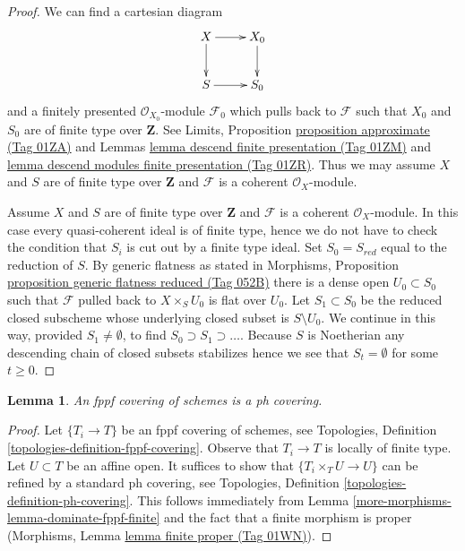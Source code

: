 \documentclass{amsart}
\theoremstyle{plain}
\newtheorem{lemma}[subsection]{Lemma}
\theoremstyle{definition}
\theoremstyle{remark}
\numberwithin{equation}{subsection}
\begin{document}
\begin{proof}
We can find a cartesian diagram
$$
\xymatrix{
X \ar[d] \ar[r] & X_0 \ar[d] \\
S \ar[r] & S_0
}
$$
and a finitely presented $\mathcal{O}_{X_0}$-module $\mathcal{F}_0$
which pulls back to $\mathcal{F}$ such that $X_0$ and $S_0$ are of
finite type over $\mathbf{Z}$. See
Limits, Proposition \href{https://stacks.math.columbia.edu/tag/01ZA}{proposition approximate (Tag 01ZA)} and
Lemmas \href{https://stacks.math.columbia.edu/tag/01ZM}{lemma descend finite presentation (Tag 01ZM)} and
\href{https://stacks.math.columbia.edu/tag/01ZR}{lemma descend modules finite presentation (Tag 01ZR)}.
Thus we may assume $X$ and $S$ are of finite type over $\mathbf{Z}$
and $\mathcal{F}$ is a coherent $\mathcal{O}_X$-module.

\medskip\noindent
Assume $X$ and $S$ are of finite type over $\mathbf{Z}$
and $\mathcal{F}$ is a coherent $\mathcal{O}_X$-module.
In this case every quasi-coherent ideal is of finite type, hence
we do not have to check the condition that $S_i$ is cut out
by a finite type ideal. Set $S_0 = S_{red}$ equal to the reduction of $S$.
By generic flatness as stated in Morphisms, Proposition
\href{https://stacks.math.columbia.edu/tag/052B}{proposition generic flatness reduced (Tag 052B)}
there is a dense open $U_0 \subset S_0$ such that $\mathcal{F}$
pulled back to $X \times_S U_0$ is flat over $U_0$.
Let $S_1 \subset S_0$ be the reduced closed subscheme whose
underlying closed subset is $S \setminus U_0$. We continue in this
way, provided $S_1 \not = \emptyset$, to find
$S_0 \supset S_1 \supset \ldots$. Because $S$
is Noetherian any descending chain of closed subsets stabilizes
hence we see that $S_t = \emptyset$ for some $t \geq 0$.
\end{proof}


\begin{lemma}
\label{more-morphisms-lemma-fppf-ph}
An fppf covering of schemes is a ph covering.
\end{lemma}

\begin{proof}
Let $\{T_i \to T\}$ be an fppf covering of schemes, see
Topologies, Definition \ref{topologies-definition-fppf-covering}.
Observe that $T_i \to T$ is locally of finite type.
Let $U \subset T$ be an affine open.
It suffices to show that $\{T_i \times_T U \to U\}$
can be refined by a standard ph covering, see
Topologies, Definition \ref{topologies-definition-ph-covering}.
This follows immediately from Lemma \ref{more-morphisms-lemma-dominate-fppf-finite}
and the fact that a finite morphism is proper
(Morphisms, Lemma \href{https://stacks.math.columbia.edu/tag/01WN}{lemma finite proper (Tag 01WN)}).
\end{proof}
\end{document}
